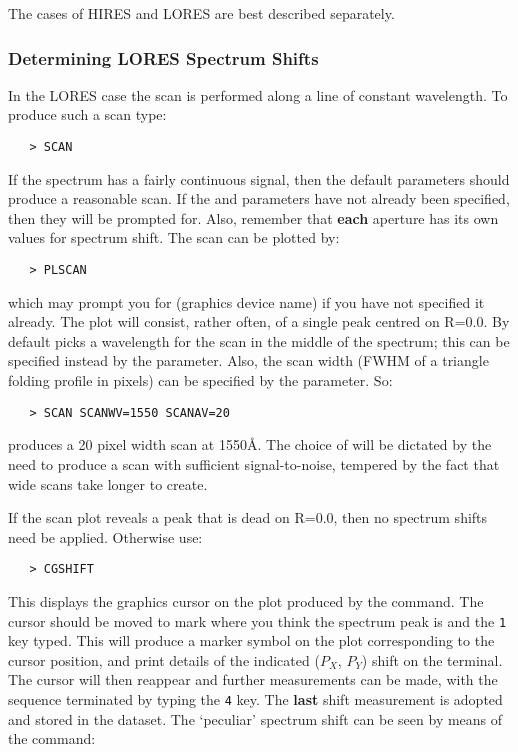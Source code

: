 The cases of HIRES and LORES are best described separately.

\subsubsection{Determining LORES Spectrum Shifts}

In the LORES case the scan is performed along a line of constant
wavelength.  To produce such a scan type:

\begin{verbatim}
   > SCAN
\end{verbatim}

If the spectrum has a fairly continuous signal, then the default
parameters should produce a reasonable scan.  If the
 and
 parameters have not already been specified, then they will be
prompted for.  Also, remember that {\bf each} aperture has its own values for
spectrum shift.  The scan can be plotted by:

\begin{verbatim}
   > PLSCAN
\end{verbatim}

which may prompt you for 
 (graphics device name) if you have not
specified it already.  The plot will consist, rather often, of a single
peak centred on R=0.0.  By default 
 picks a wavelength for the scan
in the middle of the spectrum; this can be specified instead by the
 parameter.  Also, the scan width (FWHM of a triangle folding
profile in pixels) can be specified by the 
 parameter. So:

\begin{verbatim}
   > SCAN SCANWV=1550 SCANAV=20
\end{verbatim}

produces a 20 pixel width scan at 1550\AA\@. The choice of
 will be
dictated by the need to produce a scan with sufficient
signal-to-noise, tempered by the fact that wide scans take longer to create.

If the scan plot reveals a peak that is dead on R=0.0, then no spectrum
shifts need be applied. Otherwise use:

\begin{verbatim}
   > CGSHIFT
\end{verbatim}

This displays the graphics cursor on the plot produced by the
 command. The cursor should be moved to
mark where you think the spectrum peak is
and the \verb+1+ key typed.  This will produce a marker symbol on the plot
corresponding to the cursor position, and print details of the indicated
($P_{X}$, $P_{Y}$) shift on the terminal.  The cursor will then reappear and
further measurements can be made, with the sequence terminated by typing the
\verb+4+ key.  The {\bf last} shift measurement is adopted and stored in the
dataset.
The `peculiar' spectrum shift can be seen by means of the
 command:

